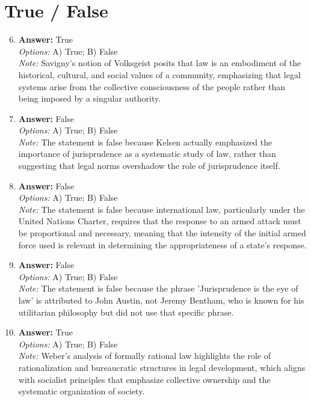 \documentclass[12pt]{article}
\begin{document}
\section*{True / False}
\begin{enumerate}[label=\arabic*.]
\setcounter{enumi}{5}
\item \textbf{Answer:} True
\\ \textit{Options:} A) True; B) False
\\ \textit{Note:} Savigny's notion of Volksgeist posits that law is an embodiment of the historical, cultural, and social values of a community, emphasizing that legal systems arise from the collective consciousness of the people rather than being imposed by a singular authority.
\item \textbf{Answer:} False
\\ \textit{Options:} A) True; B) False
\\ \textit{Note:} The statement is false because Kelsen actually emphasized the importance of jurisprudence as a systematic study of law, rather than suggesting that legal norms overshadow the role of jurisprudence itself.
\item \textbf{Answer:} False
\\ \textit{Options:} A) True; B) False
\\ \textit{Note:} The statement is false because international law, particularly under the United Nations Charter, requires that the response to an armed attack must be proportional and necessary, meaning that the intensity of the initial armed force used is relevant in determining the appropriateness of a state's response.
\item \textbf{Answer:} False
\\ \textit{Options:} A) True; B) False
\\ \textit{Note:} The statement is false because the phrase 'Jurisprudence is the eye of law' is attributed to John Austin, not Jeremy Bentham, who is known for his utilitarian philosophy but did not use that specific phrase.
\item \textbf{Answer:} True
\\ \textit{Options:} A) True; B) False
\\ \textit{Note:} Weber's analysis of formally rational law highlights the role of rationalization and bureaucratic structures in legal development, which aligns with socialist principles that emphasize collective ownership and the systematic organization of society.
\end{enumerate}
\end{document}
